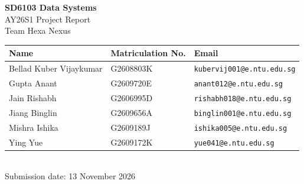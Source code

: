 \documentclass[11pt,a4paper]{article}
\begin{document}
\begin{titlepage}
\thispagestyle{empty}
\centering
\vspace*{3.2cm}
{\LARGE\bfseries SD6103 Data Systems}\\[0.6em]
{\Large AY26S1 Project Report}\\[2.2em]
{\large Team Hexa Nexus}\\[1.4em]
\begin{tabular}{lll}
\toprule
\textbf{Name} & \textbf{Matriculation No.} & \textbf{Email} \\
\midrule
Bellad Kuber Vijaykumar & G2608803K & \texttt{kubervij001@e.ntu.edu.sg} \\
Gupta Anant             & G2609720E & \texttt{anant012@e.ntu.edu.sg} \\
Jain Rishabh            & G2606995D & \texttt{rishabh018@e.ntu.edu.sg} \\
Jiang Binglin           & G2609656A & \texttt{binglin001@e.ntu.edu.sg} \\
Mishra Ishika           & G2609189J & \texttt{ishika005@e.ntu.edu.sg} \\
Ying Yue                & G2609172K & \texttt{yue041@e.ntu.edu.sg} \\
\bottomrule
\end{tabular}\\[2.4em]
Submission date: 13 November 2026
\vfill
\end{titlepage}

\tableofcontents
\newpage













\appendix




\end{document}

